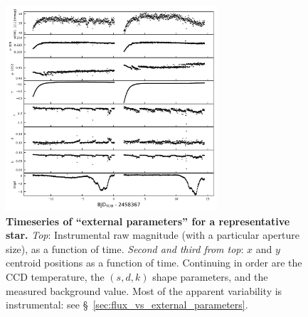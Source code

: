 \documentclass[12pt,twocolumn,tighten]{aastex62}
\begin{document}
\begin{figure}[t]
	\begin{center}
		\leavevmode
		\includegraphics[width=0.7\textwidth]{f3.png}
	\end{center}
	\vspace{-0.5cm}
	\caption{
    {\bf Timeseries of ``external parameters'' for a representative
    star.} {\it Top}: Instrumental raw magnitude (with a particular
    aperture size), as a function of time.  {\it Second and third from
    top}: $x$ and $y$ centroid positions as a function of time.
    Continuing in order are the CCD temperature, the $(s,d,k)$ shape
    parameters, and the measured background value.
    Most of the apparent variability is instrumental: see
    \S~\ref{sec:flux_vs_external_parameters}.
		\label{fig:external_parameter_timeseries}
	}
\end{figure}
\end{document}
